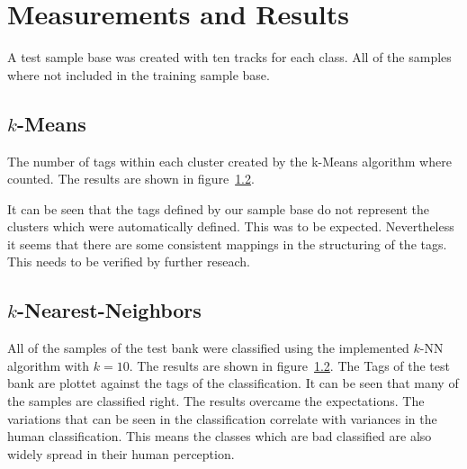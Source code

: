 \section{Measurements and Results}
\label{sec:Measurements}
A test sample base was created with ten tracks for each class. All of the samples where not included in the training sample base. 

\subsection{$k$-Means}
The number of tags within each cluster created by the k-Means algorithm where counted. The results are shown in figure~\ref{}.

It can be seen that the tags defined by our sample base do not represent the clusters which were automatically defined. This was to be expected. Nevertheless it seems that there are some consistent mappings in the structuring of the tags. This needs to be verified by further reseach. 


\subsection{$k$-Nearest-Neighbors}
All of the samples of the test bank were classified using the implemented $k$-NN algorithm with $k=10$. The results are shown in figure~\ref{}. The Tags of the test bank are plottet against the tags of the classification. It can be seen that many of the samples are classified right. The results overcame the expectations. The variations that can be seen in the classification correlate with variances in the human classification. This means the classes which are bad classified are also widely spread in their human perception. 